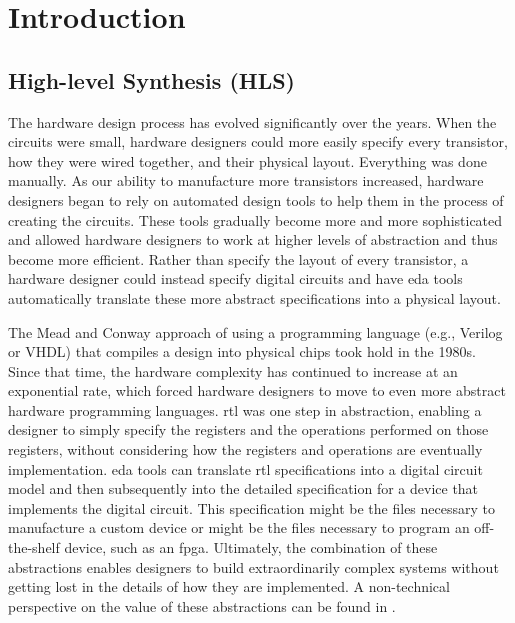 
\chapter{Introduction}
\glsresetall
\label{chapter:introduction}
\section{High-level Synthesis (HLS)}

The hardware design process has evolved significantly over the years. When the circuits were small, hardware designers could more easily specify every transistor, how they were wired together, and their physical layout. Everything was done manually. As our ability to manufacture more transistors increased, hardware designers began to rely on automated design tools to help them in the process of creating the circuits. These tools gradually become more and more sophisticated and allowed hardware designers to work at higher levels of abstraction and thus become more efficient. Rather than specify the layout of every transistor, a hardware designer could instead specify digital circuits and have \gls{eda} tools automatically translate these more abstract specifications into a physical layout. 

The Mead and Conway approach \cite{mead1980introduction} of using a programming language (e.g., Verilog or VHDL) that compiles a design into physical chips took hold in the 1980s. Since that time, the hardware complexity has continued to increase at an exponential rate, which forced hardware designers to move to even more abstract hardware programming languages. \gls{rtl} was one step in abstraction, enabling a designer to simply specify the registers and the operations performed on those registers, without considering how the registers and operations are eventually implementation. \gls{eda} tools can translate \gls{rtl} specifications into a digital circuit model and then subsequently into the detailed specification for a device that implements the digital circuit.  This specification might be the files necessary to manufacture a custom device or might be the files necessary to program an off-the-shelf device, such as an \gls{fpga}. Ultimately, the combination of these abstractions enables designers to build extraordinarily complex systems without getting lost in the details of how they are implemented.  A non-technical perspective on the value of these abstractions can be found in \cite{lee2017plato}.

